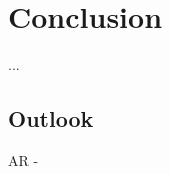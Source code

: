 \section{Conclusion}
\label{section:conclusion}
...
\subsection{Outlook}
AR - \cite{santos2016guidelines}